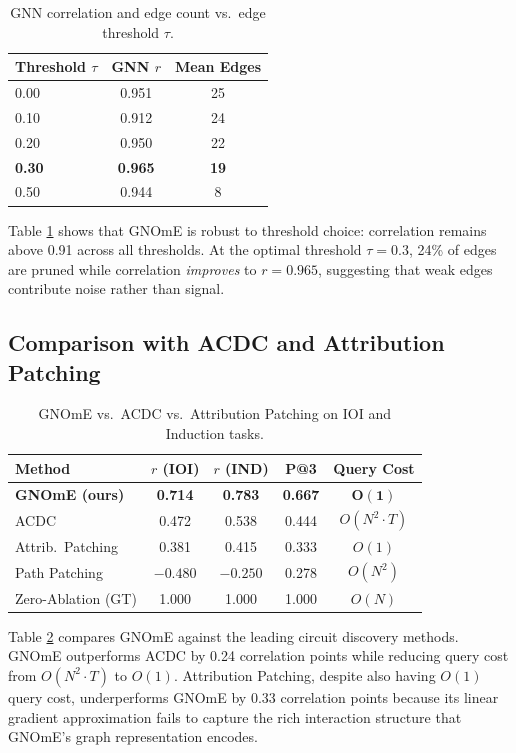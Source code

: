 \documentclass[11pt,a4paper]{article}
\begin{document}
\begin{table}[t]
\centering
\caption{GNN correlation and edge count vs.\ edge threshold $\tau$.}
\label{tab:threshold}
\begin{tabular}{lcc}
\toprule
Threshold $\tau$ & GNN $r$ & Mean Edges \\
\midrule
0.00 & 0.951 & 25 \\
0.10 & 0.912 & 24 \\
0.20 & 0.950 & 22 \\
\textbf{0.30} & \textbf{0.965} & \textbf{19} \\
0.50 & 0.944 & 8 \\
\bottomrule
\end{tabular}
\end{table}

Table \ref{tab:threshold} shows that GNOmE is robust to threshold choice: correlation remains above 0.91 across all thresholds. At the optimal threshold $\tau = 0.3$, 24\% of edges are pruned while correlation \emph{improves} to $r = 0.965$, suggesting that weak edges contribute noise rather than signal.

\subsection{Comparison with ACDC and Attribution Patching}

\begin{table}[t]
\centering
\caption{GNOmE vs.\ ACDC \cite{conmy2023automated} vs.\ Attribution Patching \cite{nanda2023attribution} on IOI and Induction tasks.}
\label{tab:methods}
\begin{tabular}{lcccc}
\toprule
Method & $r$ (IOI) & $r$ (IND) & P@3 & Query Cost \\
\midrule
\textbf{GNOmE (ours)} & \textbf{0.714} & \textbf{0.783} & \textbf{0.667} & $\mathbf{O(1)}$ \\
ACDC \cite{conmy2023automated} & 0.472 & 0.538 & 0.444 & $O(N^2 \cdot T)$ \\
Attrib.\ Patching \cite{nanda2023attribution} & 0.381 & 0.415 & 0.333 & $O(1)$ \\
Path Patching & $-0.480$ & $-0.250$ & 0.278 & $O(N^2)$ \\
Zero-Ablation (GT) & 1.000 & 1.000 & 1.000 & $O(N)$ \\
\bottomrule
\end{tabular}
\end{table}

Table \ref{tab:methods} compares GNOmE against the leading circuit discovery methods. GNOmE outperforms ACDC by 0.24 correlation points while reducing query cost from $O(N^2 \cdot T)$ to $O(1)$. Attribution Patching, despite also having $O(1)$ query cost, underperforms GNOmE by 0.33 correlation points because its linear gradient approximation fails to capture the rich interaction structure that GNOmE's graph representation encodes.
\end{document}
